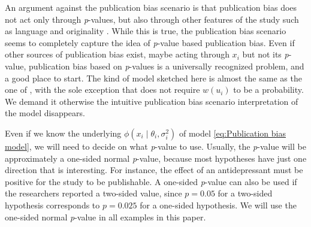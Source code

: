 \documentclass[useAMS,usenatbib,referee]{biom}
\begin{document}
An argument against the publication bias scenario is that publication bias does not act only through \textit{p}-values, but also through other features of the study such as language \citep{egger1998meta}
and originality \citep{callaham1998positive}. While this is true, the publication bias scenario seems to completely capture the idea of \textit{p}-value based publication bias. Even if other sources of publication bias exist, maybe acting through $x_{i}$ but not its \textit{p}-value, publication bias based on \textit{p}-values is a universally recognized problem, and a good place to start. The kind of model sketched here is almost the same as the one of \citet{hedges1992modeling}, with the sole exception that \citet{hedges1992modeling} does not require $w(u_i)$ to be a probability. %
We demand it otherwise the intuitive publication bias scenario interpretation of the model disappears. %

Even if we know the underlying $\phi(x_{i}\mid\theta_{i},\sigma^2_{i})$ of model \eqref{eq:Publication bias model}, we will need to decide on what \textit{p}-value to use. Usually, the \textit{p}-value will be approximately a one-sided normal \textit{p}-value, %
because most hypotheses have just one direction that is interesting. For instance, the effect of an antidepressant must be positive for the study to be publishable. A one-sided \textit{p}-value can also be used if the researchers reported a two-sided value, since $p=0.05$ for a two-sided hypothesis corresponds to $p=0.025$ for a one-sided hypothesis. We will use the one-sided normal \textit{p}-value in all examples in this paper.
\end{document}
